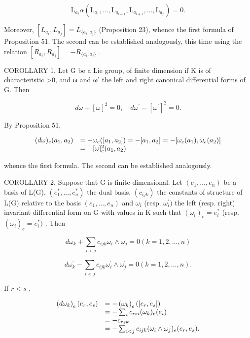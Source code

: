 \[
\mathrm{L} _ {a _ {i}} \alpha (\mathrm{L} _ {a _ {1}}, \dots , \mathrm{L} _ {a _ {i - 1}}, \mathrm{L} _ {a _ {i + 1}}, \dots , \mathrm{L} _ {a _ {p}}) = 0.
\]

Moreover, \([L_{a_{i}}, L_{a_{j}}] = L_{\{a_{i}, a_{j}\}}\) (Proposition 23), whence the first formula of Proposition 51. The second can be established analogously, this time using the relation \([R_{a_{i}}, R_{a_{j}}] = -R_{\{a_{i}, a_{j}\}}\) .

COROLLARY 1. Let G be a Lie group, of finite dimension if K is of characteristic \textgreater0, and ω and ω' the left and right canonical differential forms of G. Then

\[
d \omega + [ \omega ] ^ {2} = 0, \quad d \omega^ {\prime} - [ \omega^ {\prime} ] ^ {2} = 0.
\]

By Proposition 51,

\[
\begin{array}{r l} (d \omega) _ {e} (a _ {1}, a _ {2}) & = - \omega_ {e} ([ a _ {1}, a _ {2} ]) = - [ a _ {1}, a _ {2} ] = - [ \omega_ {e} (a _ {1}), \omega_ {e} (a _ {2}) ] \\ & = - [ \omega ] _ {e} ^ {2} (a _ {1}, a _ {2}) \end{array}
\]

whence the first formula. The second can be established analogously.

COROLLARY 2. Suppose that G is finite-dimensional. Let \((e_1, \ldots, e_n)\) be a basis of L(G), \((e_1^*, \ldots, e_n^*)\) the dual basis, \((c_{ijk})\) the constants of structure of L(G) relative to the basis \((e_1, \ldots, e_n)\) and \(\omega_i\) (resp. \(\omega_i^{\prime})\) the left (resp. right) invariant differential form on G with values in K such that \((\omega_i)_e = e_i^*\) (resp. \((\omega_i^{\prime})_e = e_i^*)\) . Then

\[
d \omega_ {k} + \sum_ {i <   j} c _ {i j k} \omega_ {i} \wedge \omega_ {j} = 0 (k = 1, 2, \dots , n)
\]

\[
d \omega_ {k} ^ {\prime} - \sum_ {i <   j} c _ {i j k} \omega_ {i} ^ {\prime} \wedge \omega_ {j} ^ {\prime} = 0 (k = 1, 2, \dots , n).
\]

If \(r < s\) ,

\[
\begin{array}{r l} \left(d \omega_ {k}\right) _ {e} (e _ {r}, e _ {s}) & = - \left(\omega_ {k}\right) _ {e} ([ e _ {r}, e _ {s} ]) \\ & = - \sum_ {i} c _ {r s i} (\omega_ {k}) _ {e} (e _ {i}) \\ & = - c _ {r s k} \\ & = - \sum_ {i <   j} c _ {i j k} (\omega_ {i} \wedge \omega_ {j}) _ {e} (e _ {r}, e _ {s}). \end{array}
\]

